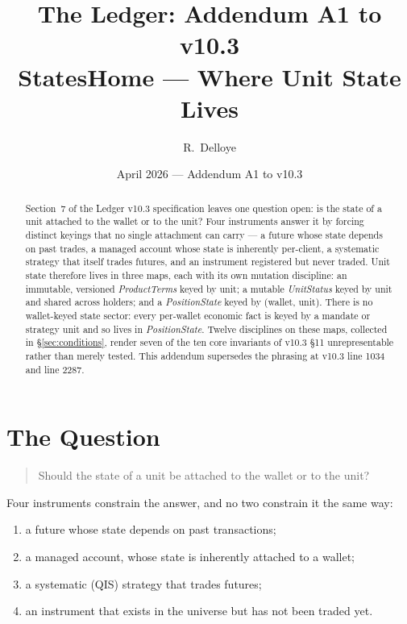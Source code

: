 \documentclass[11pt,a4paper]{article}
\title{The Ledger: Addendum A1 to v10.3\\[6pt]
\large StatesHome --- Where Unit State Lives}
\author{R.\ Delloye}
\date{April 2026 --- Addendum A1 to v10.3}
\begin{document}
\maketitle

\begin{abstract}
Section~7 of the Ledger v10.3 specification leaves one question open: is the state of a
unit attached to the wallet or to the unit? Four instruments answer it by forcing distinct
keyings that no single attachment can carry --- a future whose state depends on past
trades, a managed account whose state is inherently per-client, a systematic strategy that
itself trades futures, and an instrument registered but never traded. Unit state therefore
lives in three maps, each with its own mutation discipline: an immutable, versioned
\emph{ProductTerms} keyed by unit; a mutable \emph{UnitStatus} keyed by unit and shared
across holders; and a \emph{PositionState} keyed by (wallet, unit). There is no
wallet-keyed state sector: every per-wallet economic fact is keyed by a mandate or strategy
unit and so lives in \emph{PositionState}. Twelve disciplines on these maps, collected in
\S\ref{sec:conditions}, render seven of the ten core invariants of v10.3 \S 11
unrepresentable rather than merely tested. This addendum supersedes the phrasing at v10.3
line 1034 and line 2287.
\end{abstract}

\tableofcontents
\clearpage

\section{The Question}
\label{sec:question}

\begin{quote}
Should the state of a unit be attached to the wallet or to the unit?
\end{quote}

\noindent Four instruments constrain the answer, and no two constrain it the same way:

\begin{enumerate}[leftmargin=*]
\item a future whose state depends on past transactions;
\item a managed account, whose state is inherently attached to a wallet;
\item a systematic (QIS) strategy that trades futures;
\item an instrument that exists in the universe but has not been traded yet.
\end{enumerate}
\end{document}
